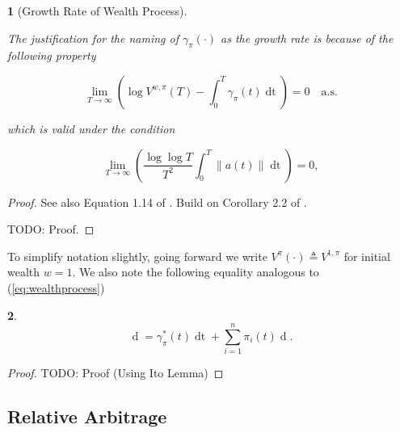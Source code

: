 \documentclass[british]{amsart} \usepackage{lmodern}
\numberwithin{equation}{section} \numberwithin{figure}{section}
\theoremstyle{plain} \newtheorem{thm}{\protect\theoremname}[section]
\theoremstyle{definition} \newtheorem{defn}[thm]{\protect\definitionname}
\theoremstyle{plain} \newtheorem{assumption}[thm]{\protect\assumptionname}
\theoremstyle{plain} \newtheorem{lem}[thm]{\protect\lemmaname}
\theoremstyle{plain} \newtheorem{prop}[thm]{\protect\propositionname}
\theoremstyle{remark} \newtheorem{rem}[thm]{\protect\remarkname}
\theoremstyle{plain} \newtheorem{cor}[thm]{\protect\corollaryname}
\renewcommand{\d}[1]{\mathop{\mathrm{d}{#1}}}
\newcommand{\defeq}{\mathop{\triangleq}} \newcommand{\almostsurely}{\text{a.s.}}
\newcommand{\norm}[1]{\left\lVert#1\right\rVert}
\begin{document}
\begin{prop} [Growth Rate of Wealth Process]
  \label{thm:wealthgrowthrate}

  The justification for the naming of $\gamma_{\pi}(\cdot)$ as the \textit{growth rate} is because of the following property

  \begin{equation*}
    \lim_{T \to \infty} 
      \left( 
      \log{V^{w,\pi}(T)} - \int_{0}^{T} \gamma_{\pi}(t)\d{t} 
      \right) = 0
    \quad \almostsurely
  \end{equation*}

  which is valid under the condition

  \begin{equation*}
    \lim_{T \to \infty}
      \left(
        \frac{\log \log T}{T^2} \int_{0}^{T} \norm{ a(t) } \d{t}
      \right) = 0,
  \end{equation*}

\end{prop}

\begin{proof}
  See also Equation 1.14 of \cite{fernholz2009}.
  Build on Corollary 2.2 of \cite{fernholz1999pgf}.

  TODO: Proof.
\end{proof}

To simplify notation slightly, going forward we write $V^{\pi}(\cdot) \defeq V^{1,\pi}$ for initial wealth $w=1$. We also note the following equality analogous to (\ref{eq:wealthprocess})

\begin{prop}

  \begin{equation}
    \label{eq:logvalueprocess}
      \d{\log V^{\pi}(t)} = \gamma_{\pi}^{*}(t)\d{t} + \sum_{i=1}^{n} \pi_{i}(t) \d{\log{X_{i}(t)}}.
  \end{equation}

\end{prop}

\begin{proof}

  TODO: Proof (Using Ito Lemma)

\end{proof}

\newpage




\subsection{Relative Arbitrage}
\end{document}
